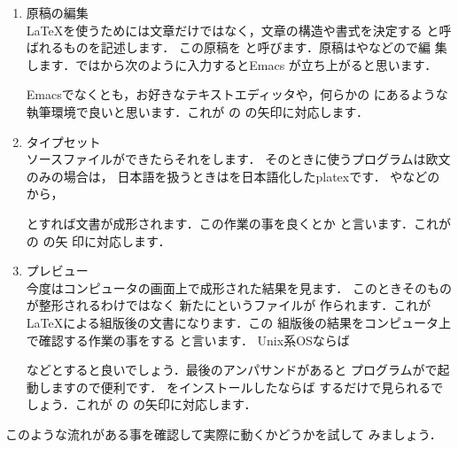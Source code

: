 %
%
%
%
%
%
\begin{enumerate}
\item 原稿の編集\\
{\LaTeX}を使うためには文章だけではなく，文章の構造や書式を決定する%
{}と呼ばれるものを記述します． この原稿を
と呼びます．原稿はやなどので編
集します．\unixos ではから次のように入力するとEmacs
が立ち上がると思います．
\begin{InTerm}
\end{InTerm}
Emacsでなくとも，お好きなテキストエディッタや，何らかの
にあるような執筆環境で良いと思います．これが
の  の矢印に対応します．

\item タイプセット \\
%
ソースファイルができたらそれをします．
そのときに使うプログラムは欧文のみの場合は，
日本語を扱うときはを日本語化した{platex}です．
やなどのから，
\begin{InTerm}
\end{InTerm}
とすれば文書が成形されます．この作業の事を良くとか
と言います．これがの  の矢
印に対応します．

\item プレビュー\\
%
今度はコンピュータの画面上で成形された結果を見ます．
このときそのものが整形されるわけではなく
新たにというファイルが
作られます．これが{\LaTeX}による組版後の文書になります．この
組版後の結果をコンピュータ上で確認する作業の事をする
と言います．
Unix系OSならば
\begin{InTerm}
\end{InTerm}
などとすると良いでしょう．最後のアンパサンド\qu{\texttt{\&}}があると
プログラムがで起動しますので便利です．
\prog{\Dviout}をインストールしたならば
するだけで見られるでしょう．これが
の  の矢印に対応します．
\end{enumerate}
このような流れがある事を確認して実際に動くかどうかを試して
みましょう．

